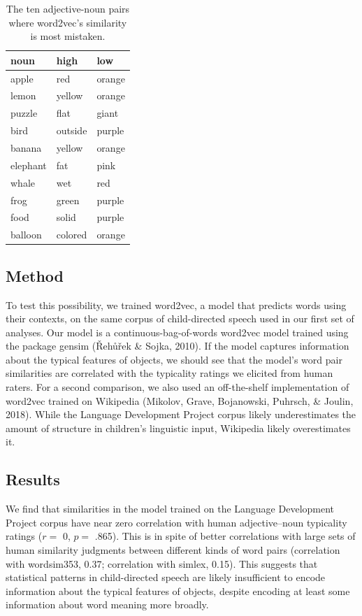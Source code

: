 \documentclass[10pt, letterpaper]{article}
\begin{document}
\begin{table}[tb]
\centering
\begin{tabular}{lll}
  \hline
noun & high & low \\ 
  \hline
apple & red & orange \\ 
  lemon & yellow & orange \\ 
  puzzle & flat & giant \\ 
  bird & outside & purple \\ 
  banana & yellow & orange \\ 
  elephant & fat & pink \\ 
  whale & wet & red \\ 
  frog & green & purple \\ 
  food & solid & purple \\ 
  balloon & colored & orange \\ 
   \hline
\end{tabular}
\caption{The ten adjective-noun pairs where word2vec's similarity is most mistaken.} 
\label{tab:pairs_tab}
\end{table}

\hypertarget{method}{%
\subsection{Method}\label{method}}

To test this possibility, we trained word2vec, a model that predicts
words using their contexts, on the same corpus of child-directed speech
used in our first set of analyses. Our model is a
continuous-bag-of-words word2vec model trained using the package gensim
(Řehůřek \& Sojka, 2010). If the model captures information about the
typical features of objects, we should see that the model's word pair
similarities are correlated with the typicality ratings we elicited from
human raters. For a second comparison, we also used an off-the-shelf
implementation of word2vec trained on Wikipedia (Mikolov, Grave,
Bojanowski, Puhrsch, \& Joulin, 2018). While the Language Development
Project corpus likely underestimates the amount of structure in
children's linguistic input, Wikipedia likely overestimates it.

\hypertarget{results-1}{%
\subsection{Results}\label{results-1}}

We find that similarities in the model trained on the Language
Development Project corpus have near zero correlation with human
adjective--noun typicality ratings (\(r =\) 0, \(p =\) .865). This is in
spite of better correlations with large sets of human similarity
judgments between different kinds of word pairs (correlation with
wordsim353, 0.37; correlation with simlex, 0.15). This suggests that
statistical patterns in child-directed speech are likely insufficient to
encode information about the typical features of objects, despite
encoding at least some information about word meaning more broadly.
\end{document}
